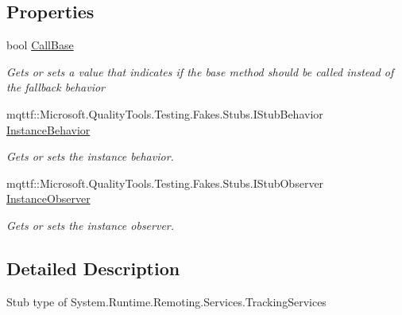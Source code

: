\subsection*{Properties}
\begin{DoxyCompactItemize}
\item 
bool \hyperlink{class_system_1_1_runtime_1_1_remoting_1_1_services_1_1_fakes_1_1_stub_tracking_services_a305337dedc05684ef9099b3f44e2e465}{Call\-Base}
\begin{DoxyCompactList}\small\item\em Gets or sets a value that indicates if the base method should be called instead of the fallback behavior\end{DoxyCompactList}\item 
mqttf\-::\-Microsoft.\-Quality\-Tools.\-Testing.\-Fakes.\-Stubs.\-I\-Stub\-Behavior \hyperlink{class_system_1_1_runtime_1_1_remoting_1_1_services_1_1_fakes_1_1_stub_tracking_services_a0523db8ac4930140fea8f161d65424ce}{Instance\-Behavior}
\begin{DoxyCompactList}\small\item\em Gets or sets the instance behavior.\end{DoxyCompactList}\item 
mqttf\-::\-Microsoft.\-Quality\-Tools.\-Testing.\-Fakes.\-Stubs.\-I\-Stub\-Observer \hyperlink{class_system_1_1_runtime_1_1_remoting_1_1_services_1_1_fakes_1_1_stub_tracking_services_a69b44c821214c3505640fc3dfe9d4389}{Instance\-Observer}
\begin{DoxyCompactList}\small\item\em Gets or sets the instance observer.\end{DoxyCompactList}\end{DoxyCompactItemize}


\subsection{Detailed Description}
Stub type of System.\-Runtime.\-Remoting.\-Services.\-Tracking\-Services



